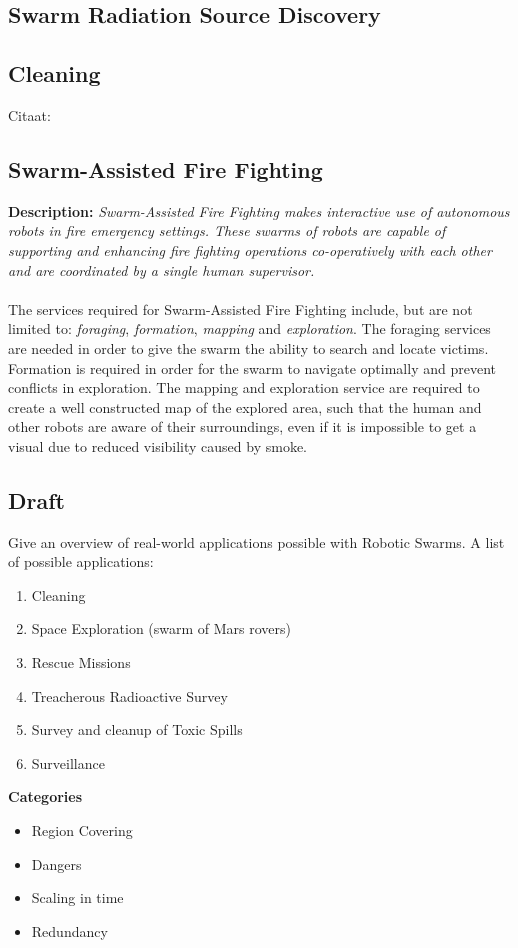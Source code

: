   \subsection{Swarm Radiation Source Discovery}
  \subsection{Cleaning}
    Citaat: \cite{Wagner2008} \cite{Altshuler2005}
  \subsection{Swarm-Assisted Fire Fighting}
  \textbf{Description: }\emph{Swarm-Assisted Fire Fighting makes interactive use of autonomous robots in fire emergency settings. These swarms of robots are capable of supporting and enhancing fire fighting operations co-operatively with each other and are coordinated by a single human supervisor.}\cite{Naghsh2008,Penders2011}\\\\
  The services required for Swarm-Assisted Fire Fighting include, but are not limited to: \emph{foraging}, \emph{formation}, \emph{mapping} and \emph{exploration}.\cite{Naghsh2008,Penders2011} The foraging services are needed in order to give the swarm the ability to search and locate victims. Formation is required in order for the swarm to navigate optimally and prevent conflicts in exploration. The mapping and exploration service are required to create a well constructed map of the explored area, such that the human and other robots are aware of their surroundings, even if it is impossible to get a visual due to reduced visibility caused by smoke.

  \subsection{Draft}
  Give an overview of real-world applications possible with Robotic Swarms. A list of possible applications:
    \begin{enumerate}
      \item Cleaning
      \item Space Exploration (swarm of Mars rovers)
      \item Rescue Missions
      \item Treacherous Radioactive Survey
      \item Survey and cleanup of Toxic Spills
      \item Surveillance
    \end{enumerate}
  \textbf{Categories}
    \begin{itemize}
      \item Region Covering
      \item Dangers
      \item Scaling in time
      \item Redundancy
    \end{itemize}
  